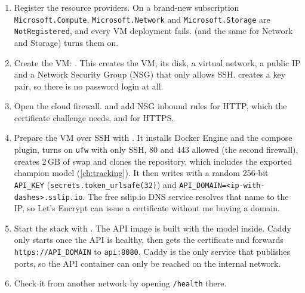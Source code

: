 \begin{enumerate}
\item Register the resource providers. On a brand-new subscription \texttt{Microsoft.Compute},
\texttt{Microsoft.Network} and \texttt{Microsoft.Storage} are \texttt{NotRegistered}, and every VM
deployment fails.  (and the same for Network
and Storage) turns them on.
\item Create the VM:
.
This creates the VM, its disk, a virtual network, a public IP and a Network Security Group (NSG)
that only allows SSH.  creates a key pair, so there is no password login
at all.
\item Open the cloud firewall.  and
 add NSG inbound rules for HTTP, which the certificate challenge
needs, and for HTTPS.
\item Prepare the VM over SSH with . It installs Docker Engine and the
compose plugin, turns on \texttt{ufw} with only SSH, 80 and 443 allowed (the second firewall),
creates 2\,GB of swap and clones the repository, which includes the exported champion model
(\cref{ch:tracking}). It then writes  with a random 256-bit \texttt{API\_KEY}
(\texttt{secrets.token\_urlsafe(32)}) and \texttt{API\_DOMAIN=<ip-with-dashes>.sslip.io}. The free
sslip.io DNS service resolves that name to the IP, so Let's Encrypt can issue a certificate
without me buying a domain.
\item Start the stack with
. The
API image is built with the model inside. Caddy only starts once the API is healthy, then gets the
certificate and forwards \texttt{https://API\_DOMAIN} to \texttt{api:8080}. Caddy is the only
service that publishes ports, so the API container can only be reached on the internal network.
\item Check it from another network by opening \texttt{/health} there.
\end{enumerate}


